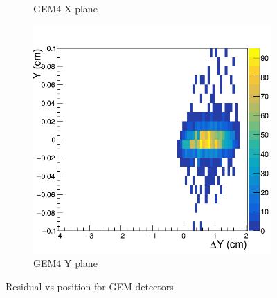 \begin{figure}[h!]
\begin{subfigure}[l]{.45\textwidth}
   \caption{GEM4 X plane}
   \label{fig:GEM4X_before}
 \end{subfigure}
 \begin{subfigure}[r]{.45\textwidth}
   \centering
   \includegraphics[width=\linewidth]{thesis_figures/alignment/Run_3211_T/G4Y_after_millepede_U.png}
   \caption{GEM4 Y plane}
   \label{fig:GEM4Y_before}
 \end{subfigure}
 \caption{Residual vs position for GEM detectors}
 \label{fig:res_vs_pos}
\end{figure}



